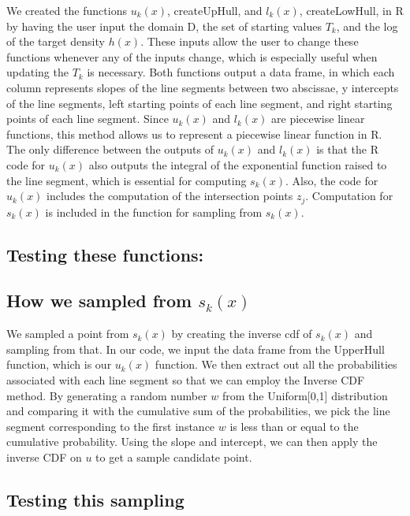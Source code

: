\documentclass[12pt]{article}
\begin{document}
We created the functions $u_k(x)$, createUpHull, and $l_k(x)$, createLowHull, in R by having the user input the domain D, the set of starting values $T_k$, and the log of the target density $h(x)$.  These inputs allow the user to change these functions whenever any of the inputs change, which is especially useful when updating the $T_k$ is necessary.  Both functions output a data frame, in which each column represents slopes of the line segments between two abscissae, y intercepts of the line segments, left starting points of each line segment, and right starting points of each line segment.  Since $u_k(x)$ and $l_k(x)$ are piecewise linear functions, this method allows us to represent a piecewise linear function in R.  The only difference between the outputs of $u_k(x)$ and $l_k(x)$ is that the R code for $u_k(x)$ also outputs the integral of the exponential function raised to the line segment, which is essential for computing $s_k(x)$.  Also, the code for $u_k(x)$ includes the computation of the intersection points $z_j$.  Computation for $s_k(x)$ is included in the function for sampling from $s_k(x)$.

\subsection*{Testing these functions:}

\subsection*{How we sampled from $s_k(x)$}

We sampled a point from $s_k(x)$ by creating the inverse cdf of $s_k(x)$ and sampling from that.  In our code, we input the data frame from the UpperHull function, which is our $u_k(x)$ function. We then extract out all the probabilities associated with each line segment so that we can employ the Inverse CDF method.  By generating a random number $w$ from the Uniform[0,1] distribution and comparing it with the cumulative sum of the probabilities, we pick the line segment corresponding to the first instance $w$ is less than or equal to the cumulative probability.  Using the slope and intercept, we can then apply the inverse CDF on $u$ to get a sample candidate point.\\

\subsection*{Testing this sampling}
\end{document}
